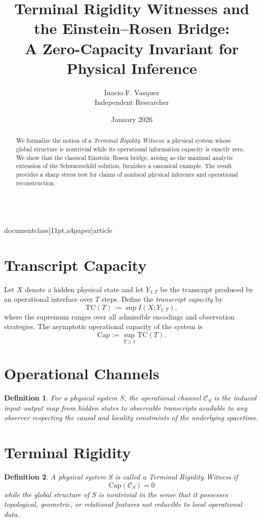 \\documentclass[11pt,a4paper]{article}
\title{Terminal Rigidity Witnesses and the Einstein--Rosen Bridge:\\
A Zero-Capacity Invariant for Physical Inference}
\author{Inacio F. Vasquez\\Independent Researcher}
\date{January 2026}
\newtheorem{definition}{Definition}
\newcommand{\Capacity}{\mathrm{Cap}}
\newcommand{\TC}{\mathrm{TC}}
\begin{document}
\maketitle

\begin{abstract}
We formalize the notion of a \emph{Terminal Rigidity Witness}: a physical system whose
global structure is nontrivial while its operational information capacity is exactly zero.
We show that the classical Einstein--Rosen bridge, arising as the maximal analytic extension
of the Schwarzschild solution, furnishes a canonical example. The result provides a sharp
stress test for claims of nonlocal physical inference and operational reconstruction.
\end{abstract}

\section{Transcript Capacity}

Let $X$ denote a hidden physical state and let $Y_{1:T}$ be the transcript produced by an
operational interface over $T$ steps. Define the \emph{transcript capacity} by
\[
\TC(T) := \sup I(X; Y_{1:T}),
\]
where the supremum ranges over all admissible encodings and observation strategies.
The asymptotic operational capacity of the system is
\[
\Capacity := \sup_{T \ge 1} \TC(T).
\]

\section{Operational Channels}

\begin{definition}
For a physical system $S$, the \emph{operational channel} $\mathcal C_S$ is the induced
input--output map from hidden states to observable transcripts available to any observer
respecting the causal and locality constraints of the underlying spacetime.
\end{definition}

\section{Terminal Rigidity}

\begin{definition}
A physical system $S$ is called a \emph{Terminal Rigidity Witness} if
\[
\Capacity(\mathcal C_S) = 0
\]
while the global structure of $S$ is nontrivial in the sense that it possesses
topological, geometric, or relational features not reducible to local operational data.
\end{definition}
\end{document}
